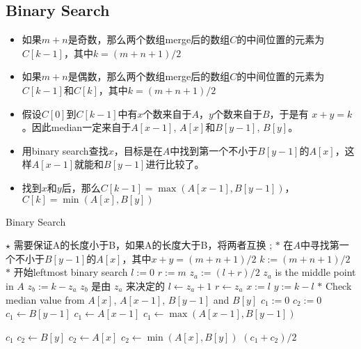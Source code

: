 \subsection{Binary Search}
\begin{itemize}
    \item 如果$m+n$是奇数，那么两个数组merge后的数组$C$的中间位置的元素为$C[k-1]$，其中$k=(m+n+1)/2$
    \item 如果$m+n$是偶数，那么两个数组merge后的数组$C$的中间位置的元素为$C[k-1]$和$C[k]$，其中$k=(m+n+1)/2$
    \item 假设$C[0]$到$C[k-1]$中有$x$个数来自于$A$，$y$个数来自于$B$，于是有 $x+y=k$。因此median一定来自于$A[x-1]$, $A[x]$和$B[y-1]$, $B[y]$。
    \item 用binary search查找$x$，目标是在$A$中找到第一个不小于$B[y-1]$的$A[x]$，这样$A[x-1]$就能和$B[y-1]$进行比较了。
    \item 找到$x$和$y$后，那么$C[k-1]=\max(A[x-1],B[y-1])$，$C[k]=\min(A[x], B[y])$
\end{itemize}
\setcounter{algorithm}{0}
\begin{algorithm}[H]
\caption{Binary Search}
\begin{algorithmic}[1]
\State $\star$ 需要保证A的长度小于B，如果A的长度大于B，将两者互换
\State \Return {};
\EndIf
\State $\ast$ 在$A$中寻找第一个不小于$B[y-1]$的$A[x]$，其中$x+y=(m+n+1)/2$
\State $k:=(m+n+1)/2$
\State $\ast$ 开始leftmost binary search
\State $l:=0$
\State $r:=m$
\State $z_a:=(l+r)/2$ \Comment $z_a$ is the middle point in $A$
\State $z_b:=k-z_a$ \Comment $z_b$ 是由 $z_a$ 来决定的
\State $l\gets z_a+1$
\Else
\State $r\gets z_a$
\EndIf
\EndWhile
\State $x:=l$
\State $y:=k-l$
\State $\ast$ Check median value from $A[x]$, $A[x-1]$, $B[y-1]$ and $B[y]$
\State $c_1:=0$
\State $c_2:=0$
\State $c_1\gets B[y-1]$
\State $c_1\gets A[x-1]$
\Else
\State $c_1\gets\max(A[x-1],B[y-1])$
\EndIf
{}
\end{algorithmic}
\end{algorithm}
\begin{algorithm}[H]
\begin{algorithmic}[1]
\State \Return $c_1$
\EndIf
{}
\State $c_2\gets B[y]$
\State $c_2\gets A[x]$
\Else
\State $c_2\gets\min(A[x],B[y])$
\EndIf
\State \Return $(c_1+c_2)/2$
\EndProcedure
\end{algorithmic}
\end{algorithm}
